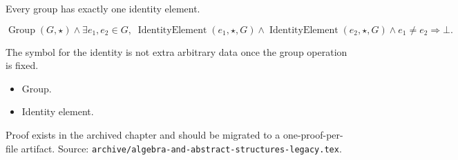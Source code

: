 \begin{remark*}
Every group has exactly one identity element.
\end{remark*}

\begin{remark*}
\[
\operatorname{Group}(G,\star)
\land
\exists e_1,e_2\in G,\;
\operatorname{IdentityElement}(e_1,\star,G)
\land
\operatorname{IdentityElement}(e_2,\star,G)
\land e_1\neq e_2
\Longrightarrow \bot.
\]
\end{remark*}

\begin{remark*}[Interpretation]
The symbol for the identity is not extra arbitrary data once the group
operation is fixed.
\end{remark*}

\begin{remark*}[Dependencies]
\begin{itemize}
  \item Group.
  \item Identity element.
\end{itemize}
\end{remark*}

\begin{remark*}
Proof exists in the archived chapter and should be migrated to a
one-proof-per-file artifact.
Source: \texttt{archive/algebra-and-abstract-structures-legacy.tex}.
\end{remark*}
